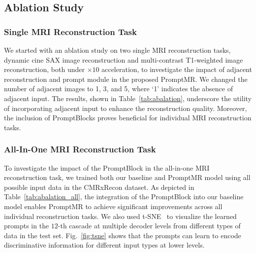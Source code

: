\documentclass[runningheads]{llncs}
\begin{document}
\subsection{Ablation Study}

\subsubsection{Single MRI Reconstruction Task}
We started with an ablation study on two single MRI reconstruction tasks, dynamic cine SAX image reconstruction and multi-contrast T1-weighted image reconstruction, both under $\times 10$ acceleration, to investigate the impact of adjacent reconstruction and prompt module in the proposed PromptMR. 
We changed the number of adjacent images to 1, 3, and 5, where `1' indicates the absence of adjacent input. The results, shown in Table~\ref{tab:abalation}, underscore the utility of incorporating adjacent input to enhance the reconstruction quality. Moreover, the inclusion of PromptBlocks proves beneficial for individual MRI reconstruction tasks.

\begin{table}[t!]
    \centering
    \label{tab:abalation}
\end{table}

\subsubsection{All-In-One MRI Reconstruction Task}
To investigate the impact of the PromptBlock in the all-in-one MRI reconstruction task, we trained both our baseline and PromptMR model using all possible input data in the CMRxRecon dataset. As depicted in Table~\ref{tab:abalation_all}, the integration of the PromptBlock into our baseline model enables PromptMR to achieve significant improvements across all individual reconstruction tasks. We also used t-SNE~\cite{van2008visualizing} to visualize the learned prompts in the $12$-th cascade at multiple decoder levels from different types of data in the test set. Fig.~\ref{fig:tsne} shows that the prompts can learn to encode discriminative information for different input types at lower levels.
\end{document}
